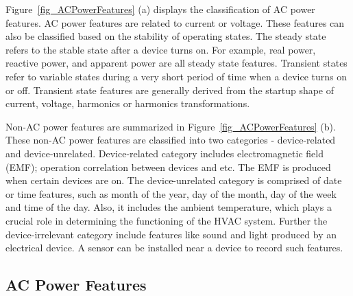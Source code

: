 
Figure~\ref{fig_ACPowerFeatures} (a) displays the classification of AC power features.
AC power features are related to current or voltage.
These features can also be classified based on the stability of operating states.
The steady state refers to the stable state after a device turns on.
For example, real power, reactive power, and apparent power
are all steady state features.
Transient states refer to variable states during a very
short period of time when a device turns on or off.
Transient state features are generally derived from
the startup shape of current, voltage,
harmonics or harmonics transformations.
%

Non-AC power features are summarized in %
Figure~\ref{fig_ACPowerFeatures} (b). 
%
These non-AC power features are classified into two categories - 
device-related and device-unrelated. 
Device-related category includes electromagnetic field (EMF); 
operation correlation between devices and etc.
The EMF is produced when certain devices are on. 
The device-unrelated category is comprised of 
date or time features, such as month of the year,
day of the month, day of the week and time of the day.  
Also, it includes the ambient temperature, which
plays a crucial role in determining the functioning
of the HVAC system.
Further the device-irrelevant category include features like sound and 
light produced by an electrical device. 
A sensor can be installed near a device 
to record such features.  

\subsection{AC Power Features}
